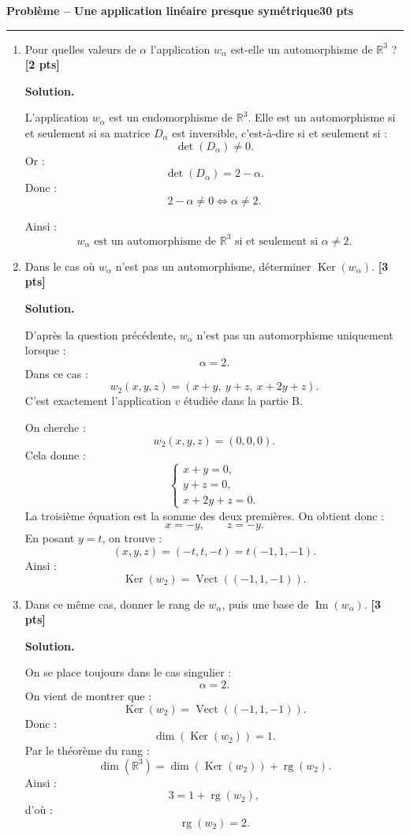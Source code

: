 \documentclass[11pt,a4paper]{article}
\newcommand{\pts}[1]{\hfill \textbf{[#1 pts]}}
\newcommand{\R}{\mathbb{R}}
\newcommand{\Ker}{\operatorname{Ker}}
\newcommand{\Img}{\operatorname{Im}}
\newcommand{\rg}{\operatorname{rg}}
\newcommand{\Vect}{\operatorname{Vect}}
\newcounter{probleme}
\newenvironment{probleme}[2]{
    \refstepcounter{probleme}
    \vspace{0.6cm}
    {\Large\color{bleu}\textbf{Problème \theprobleme{} -- #1}}\hfill \textbf{#2 pts}
    \par\medskip
    \hrule
    \medskip
}{\vspace{0.5cm}}
\newcommand{\solution}{
    \textbf{\color{bleu}Solution. }
}
\begin{document}
\begin{probleme}{Une application linéaire presque symétrique}{30}
\begin{enumerate}[resume]
    \item Pour quelles valeurs de \(\alpha\) l'application \(w_\alpha\) est-elle un automorphisme de \(\R^3\) ? \pts{2}

    \solution

    L'application \(w_\alpha\) est un endomorphisme de \(\R^3\). Elle est un automorphisme si et seulement si sa matrice \(D_\alpha\) est inversible, c'est-à-dire si et seulement si :
    \[
    \det(D_\alpha)\neq 0.
    \]
    Or :
    \[
    \det(D_\alpha)=2-\alpha.
    \]
    Donc :
    \[
    2-\alpha\neq 0
    \Longleftrightarrow
    \alpha\neq 2.
    \]

    Ainsi :
    \[
    \boxed{w_\alpha\text{ est un automorphisme de }\R^3\text{ si et seulement si }\alpha\neq 2.}
    \]

    \item Dans le cas où \(w_\alpha\) n'est pas un automorphisme, déterminer \(\Ker(w_\alpha)\). \pts{3}

    \solution

    D'après la question précédente, \(w_\alpha\) n'est pas un automorphisme uniquement lorsque :
    \[
    \alpha=2.
    \]
    Dans ce cas :
    \[
    w_2(x,y,z)=(x+y,\ y+z,\ x+2y+z).
    \]
    C'est exactement l'application \(v\) étudiée dans la partie B.

    On cherche :
    \[
    w_2(x,y,z)=(0,0,0).
    \]
    Cela donne :
    \[
    \begin{cases}
    x+y=0,\\
    y+z=0,\\
    x+2y+z=0.
    \end{cases}
    \]
    La troisième équation est la somme des deux premières. On obtient donc :
    \[
    x=-y,\qquad z=-y.
    \]
    En posant \(y=t\), on trouve :
    \[
    (x,y,z)=(-t,t,-t)=t(-1,1,-1).
    \]
    Ainsi :
    \[
    \boxed{\Ker(w_2)=\Vect((-1,1,-1)).}
    \]

    \item Dans ce même cas, donner le rang de \(w_\alpha\), puis une base de \(\Img(w_\alpha)\). \pts{3}

    \solution

    On se place toujours dans le cas singulier :
    \[
    \alpha=2.
    \]
    On vient de montrer que :
    \[
    \Ker(w_2)=\Vect((-1,1,-1)).
    \]
    Donc :
    \[
    \dim(\Ker(w_2))=1.
    \]
    Par le théorème du rang :
    \[
    \dim(\R^3)=\dim(\Ker(w_2))+\rg(w_2).
    \]
    Ainsi :
    \[
    3=1+\rg(w_2),
    \]
    d'où :
    \[
    \boxed{\rg(w_2)=2.}
    \]


\end{enumerate}
\end{probleme}
\end{document}
